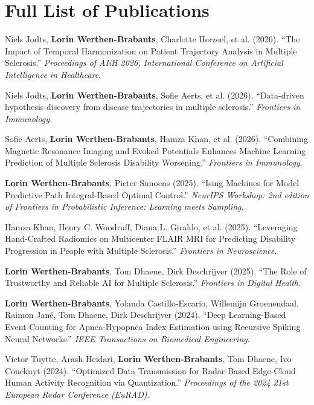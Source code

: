 \documentclass[10.5pt,a4paper]{article}
\begin{document}
\section{Full List of Publications}

\small
\begin{enumerate}[leftmargin=1.4em, itemsep=4pt, topsep=2pt, label={[\arabic*]}]
\item Niels Jodts, \textbf{Lorin Werthen-Brabants}, Charlotte Herzeel, et al. (2026). ``The Impact of Temporal Harmonization on Patient Trajectory Analysis in Multiple Sclerosis.'' \textit{Proceedings of AIiH 2026, International Conference on Artificial Intelligence in Healthcare}.
\item Niels Jodts, \textbf{Lorin Werthen-Brabants}, Sofie Aerts, et al. (2026). ``Data-driven hypothesis discovery from disease trajectories in multiple sclerosis.'' \textit{Frontiers in Immunology}.
\item Sofie Aerts, \textbf{Lorin Werthen-Brabants}, Hamza Khan, et al. (2026). ``Combining Magnetic Resonance Imaging and Evoked Potentials Enhances Machine Learning Prediction of Multiple Sclerosis Disability Worsening.'' \textit{Frontiers in Immunology}.
\item \textbf{Lorin Werthen-Brabants}, Pieter Simoens (2025). ``Ising Machines for Model Predictive Path Integral-Based Optimal Control.'' \textit{NeurIPS Workshop: 2nd edition of Frontiers in Probabilistic Inference: Learning meets Sampling}.
\item Hamza Khan, Henry C. Woodruff, Diana L. Giraldo, et al. (2025). ``Leveraging Hand-Crafted Radiomics on Multicenter FLAIR MRI for Predicting Disability Progression in People with Multiple Sclerosis.'' \textit{Frontiers in Neuroscience}.
\item \textbf{Lorin Werthen-Brabants}, Tom Dhaene, Dirk Deschrijver (2025). ``The Role of Trustworthy and Reliable AI for Multiple Sclerosis.'' \textit{Frontiers in Digital Health}.
\item \textbf{Lorin Werthen-Brabants}, Yolanda Castillo-Escario, Willemijn Groenendaal, Raimon Jan\'e, Tom Dhaene, Dirk Deschrijver (2024). ``Deep Learning-Based Event Counting for Apnea-Hypopnea Index Estimation using Recursive Spiking Neural Networks.'' \textit{IEEE Transactions on Biomedical Engineering}.
\item Victor Tuytte, Arash Heidari, \textbf{Lorin Werthen-Brabants}, Tom Dhaene, Ivo Couckuyt (2024). ``Optimized Data Transmission for Radar-Based Edge-Cloud Human Activity Recognition via Quantization.'' \textit{Proceedings of the 2024 21st European Radar Conference (EuRAD)}.

\end{enumerate}
\end{document}
